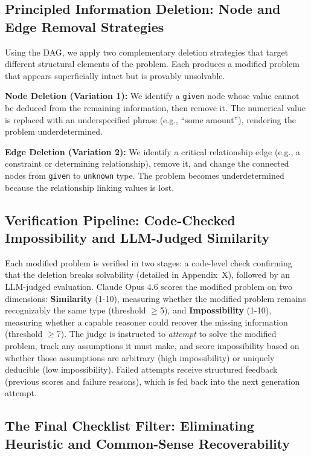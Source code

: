 \documentclass{article} %
\begin{document}
\subsection{Principled Information Deletion: Node and Edge Removal Strategies}
\label{sec:deletion}

Using the DAG, we apply two complementary deletion strategies that target different structural elements of the problem. Each produces a modified problem that appears superficially intact but is provably unsolvable.

\textbf{Node Deletion (Variation 1):}
We identify a \texttt{given} node whose value cannot be deduced from the remaining information, then remove it. The numerical value is replaced with an underspecified phrase (e.g., ``some amount''), rendering the problem underdetermined.

\textbf{Edge Deletion (Variation 2):}
We identify a critical relationship edge (e.g., a constraint or determining relationship), remove it, and change the connected nodes from \texttt{given} to \texttt{unknown} type. The problem becomes underdetermined because the relationship linking values is lost.

\subsection{Verification Pipeline: Code-Checked Impossibility and LLM-Judged Similarity}
\label{sec:verification}

Each modified problem is verified in two stages: a code-level check confirming that the deletion breaks solvability (detailed in Appendix~X), followed by an LLM-judged evaluation. Claude Opus 4.6 scores the modified problem on two dimensions: \textbf{Similarity} (1-10), measuring whether the modified problem remains recognizably the same type (threshold $\geq$5), and \textbf{Impossibility} (1-10), measuring whether a capable reasoner could recover the missing information (threshold $\geq$7). The judge is instructed to \emph{attempt} to solve the modified problem, track any assumptions it must make, and score impossibility based on whether those assumptions are arbitrary (high impossibility) or uniquely deducible (low impossibility). Failed attempts receive structured feedback (previous scores and failure reasons), which is fed back into the next generation attempt.


\subsection{The Final Checklist Filter: Eliminating Heuristic and Common-Sense Recoverability}
\label{sec:checklist}
\end{document}
